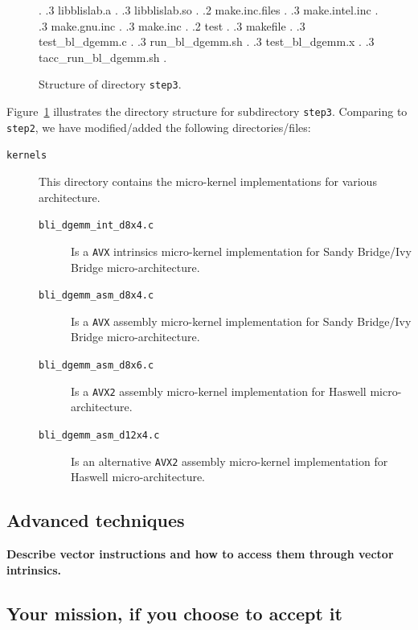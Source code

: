 \begin{figure}[tb!]
\begin{center}
\begin{minipage}{4in}
{%
.
        .3 libblislab.a
.
        .3 libblislab.so
.
		.2 make.inc.files
.
		.3 make.intel.inc 
.
		.3 make.gnu.inc 
.
		.3 make.inc 
.
		.2 test 
.
		.3 makefile 
.
		.3 test\_bl\_dgemm.c 
.
		.3 run\_bl\_dgemm.sh 
.
		.3 test\_bl\_dgemm.x 
.       
		.3 tacc\_run\_bl\_dgemm.sh 
.	
	}
\end{minipage}
\end{center}
\caption{Structure of directory {\tt step3}.}
\label{fig:DirStep1}
\end{figure}

Figure~\ref{fig:DirStep1} illustrates the directory
structure for subdirectory {\tt step3}. Comparing to {\tt step2}, we have modified/added the following directories/files:

\begin{description}
\item[{\tt kernels}] This directory contains the micro-kernel implementations for various architecture.
\begin{description}
\item[{\tt bli\_dgemm\_int\_d8x4.c}] Is a {\tt AVX} intrinsics micro-kernel implementation for Sandy Bridge/Ivy Bridge micro-architecture.
\item[{\tt bli\_dgemm\_asm\_d8x4.c}] Is a {\tt AVX} assembly micro-kernel implementation for Sandy Bridge/Ivy Bridge micro-architecture.
\item[{\tt bli\_dgemm\_asm\_d8x6.c}] Is a {\tt AVX2} assembly micro-kernel implementation for Haswell micro-architecture.
\item[{\tt bli\_dgemm\_asm\_d12x4.c}] Is an alternative {\tt AVX2} assembly micro-kernel implementation for Haswell micro-architecture.
\end{description}
\end{description}

\subsection{Advanced techniques}

{\bf Describe vector instructions and how to access them through vector intrinsics.}

\subsection{Your mission, if you choose to accept it}


